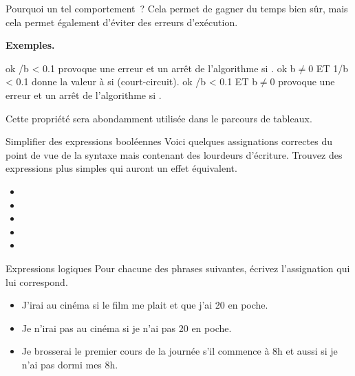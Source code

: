 				Pourquoi un tel comportement~?
				Cela permet de gagner du temps bien sûr,
				mais cela permet également d’éviter des erreurs d’exécution.
				 
				\textbf{Exemples.}
				\begin{LDA}
					\Let ok /b < 0.1
						\RComment provoque une erreur et un arrêt
						de l’algorithme si . 
					\Let ok \Gets b$\neq$0 ET 1/b < 0.1
						\RComment donne la valeur  à  
						si  (court-circuit). 
					\Let ok /b < 0.1 ET b$\neq$0
						\RComment provoque une erreur et un arrêt
						de l’algorithme si . 
				\end{LDA}
				
				Cette propriété sera abondamment utilisée dans le parcours
				de tableaux.
				
			\begin{Exercice}{Simplifier des expressions booléennes}
				Voici quelques assignations correctes du point de vue de la
				syntaxe mais contenant des lourdeurs d’écriture.
				Trouvez des expressions plus simples
				qui auront un effet équivalent.
				\begin{itemize}
					\item {}
					\item {}
					\item {}
					\item {}
					\item {}
				\end{itemize}		
			\end{Exercice}
		
			\begin{Exercice}{Expressions logiques}
				Pour chacune des phrases suivantes,
				écrivez l’assignation qui lui correspond.
				\begin{itemize}
				\item J’irai au cinéma si le film me plait et que j’ai 20\texteuro{} en poche.
				\item Je n’irai pas au cinéma si je n’ai pas 20\texteuro{} en poche.
				\item Je brosserai le premier cours de la journée s’il commence à 8h et aussi si je n’ai pas dormi mes 8h.
				\end{itemize}
			\end{Exercice}
			
